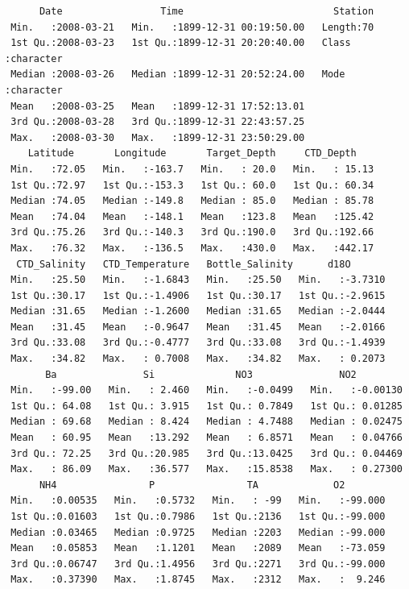 \documentclass[
  letterpaper,
  DIV=11,
  numbers=noendperiod]{scrartcl}
\begin{document}
\begin{verbatim}
      Date                 Time                          Station         
 Min.   :2008-03-21   Min.   :1899-12-31 00:19:50.00   Length:70         
 1st Qu.:2008-03-23   1st Qu.:1899-12-31 20:20:40.00   Class :character  
 Median :2008-03-26   Median :1899-12-31 20:52:24.00   Mode  :character  
 Mean   :2008-03-25   Mean   :1899-12-31 17:52:13.01                     
 3rd Qu.:2008-03-28   3rd Qu.:1899-12-31 22:43:57.25                     
 Max.   :2008-03-30   Max.   :1899-12-31 23:50:29.00                     
    Latitude       Longitude       Target_Depth     CTD_Depth     
 Min.   :72.05   Min.   :-163.7   Min.   : 20.0   Min.   : 15.13  
 1st Qu.:72.97   1st Qu.:-153.3   1st Qu.: 60.0   1st Qu.: 60.34  
 Median :74.05   Median :-149.8   Median : 85.0   Median : 85.78  
 Mean   :74.04   Mean   :-148.1   Mean   :123.8   Mean   :125.42  
 3rd Qu.:75.26   3rd Qu.:-140.3   3rd Qu.:190.0   3rd Qu.:192.66  
 Max.   :76.32   Max.   :-136.5   Max.   :430.0   Max.   :442.17  
  CTD_Salinity   CTD_Temperature   Bottle_Salinity      d18O        
 Min.   :25.50   Min.   :-1.6843   Min.   :25.50   Min.   :-3.7310  
 1st Qu.:30.17   1st Qu.:-1.4906   1st Qu.:30.17   1st Qu.:-2.9615  
 Median :31.65   Median :-1.2600   Median :31.65   Median :-2.0444  
 Mean   :31.45   Mean   :-0.9647   Mean   :31.45   Mean   :-2.0166  
 3rd Qu.:33.08   3rd Qu.:-0.4777   3rd Qu.:33.08   3rd Qu.:-1.4939  
 Max.   :34.82   Max.   : 0.7008   Max.   :34.82   Max.   : 0.2073  
       Ba               Si              NO3               NO2          
 Min.   :-99.00   Min.   : 2.460   Min.   :-0.0499   Min.   :-0.00130  
 1st Qu.: 64.08   1st Qu.: 3.915   1st Qu.: 0.7849   1st Qu.: 0.01285  
 Median : 69.68   Median : 8.424   Median : 4.7488   Median : 0.02475  
 Mean   : 60.95   Mean   :13.292   Mean   : 6.8571   Mean   : 0.04766  
 3rd Qu.: 72.25   3rd Qu.:20.985   3rd Qu.:13.0425   3rd Qu.: 0.04469  
 Max.   : 86.09   Max.   :36.577   Max.   :15.8538   Max.   : 0.27300  
      NH4                P                TA             O2         
 Min.   :0.00535   Min.   :0.5732   Min.   : -99   Min.   :-99.000  
 1st Qu.:0.01603   1st Qu.:0.7986   1st Qu.:2136   1st Qu.:-99.000  
 Median :0.03465   Median :0.9725   Median :2203   Median :-99.000  
 Mean   :0.05853   Mean   :1.1201   Mean   :2089   Mean   :-73.059  
 3rd Qu.:0.06747   3rd Qu.:1.4956   3rd Qu.:2271   3rd Qu.:-99.000  
 Max.   :0.37390   Max.   :1.8745   Max.   :2312   Max.   :  9.246  
\end{verbatim}
\end{document}
